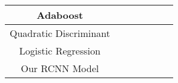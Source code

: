 \begin{table}[]
\begin{tabular}{|c|c|c|c|c|c|c|}
Adaboost               &                                                             &                                                           &                                                           &                                                           &                                                           &                                                           \\ \hline
Quadratic Discriminant &                                                             &                                                           &                                                           &                                                           &                                                           &                                                           \\ \hline
Logistic Regression    &                                                             &                                                           &                                                           &                                                           &                                                           &                                                           \\ \hline
Our RCNN Model         &                                                             &                                                           &                                                           &                                                           &                                                           &                                                           \\ \hline
\end{tabular}
\end{table}


